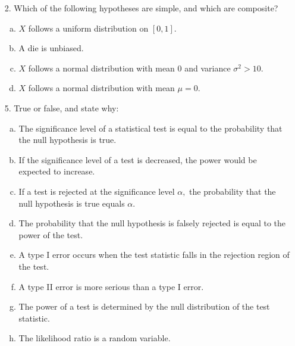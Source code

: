 \documentclass{article}
\begin{document}
\begin{itemize}
	\item[2.] Which of the following hypotheses are simple, and which are composite?

		\begin{enumerate}[a.]
			\item $X$ follows a uniform distribution on $[0, 1].$

			\item A die is unbiased.

			\item $X$ follows a normal distribution with mean 0 and variance $\sigma^2>10.$

			\item $X$ follows a normal distribution with mean $\mu=0.$
				
		\end{enumerate}

	\item[5.] True or false, and state why:

		\begin{enumerate}[a.]
			\item The significance level of a statistical test is equal to the probability that the null hypothesis is true.

			\item If the significance level of a test is decreased, the power would be expected to increase.

			\item If a test is rejected at the significance level $\alpha,$ the probability that the null hypothesis is true equals $\alpha.$

			\item The probability that the null hypothesis is falsely rejected is equal to the power of the test.

			\item A type I error occurs when the test statistic falls in the rejection region of the test.

			\item A type II error is more serious than a type I error.

			\item The power of a test is determined by the null distribution of the test statistic.

			\item The likelihood ratio is a random variable.
				
		\end{enumerate}


\end{itemize}
\end{document}
